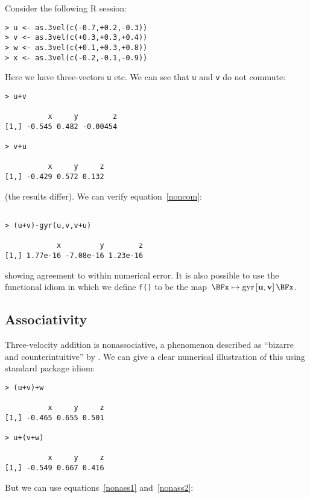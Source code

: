 \documentclass[ijoc,nonblindrev]{informs3} %
\begin{document}
Consider the following R session:

\begin{verbatim}
> u <- as.3vel(c(-0.7,+0.2,-0.3))
> v <- as.3vel(c(+0.3,+0.3,+0.4))
> w <- as.3vel(c(+0.1,+0.3,+0.8))
> x <- as.3vel(c(-0.2,-0.1,-0.9))

\end{verbatim}

Here we have three-vectors {\tt u} etc.  We can see that {\tt u} and
{\tt v} do not commute:

\begin{verbatim}
> u+v

          x     y        z
[1,] -0.545 0.482 -0.00454

> v+u

          x     y     z
[1,] -0.429 0.572 0.132

\end{verbatim}

(the results differ).  We can verify equation~\ref{noncom}:

\begin{verbatim}

> (u+v)-gyr(u,v,v+u)

            x         y        z 
[1,] 1.77e-16 -7.08e-16 1.23e-16

\end{verbatim}

showing agreement to within numerical error.  It is also possible to
use the functional idiom in which we define {\tt f()} to be the
map~$\BFx\mapsto\gyr{u}{v}\BFx$.

\subsection{Associativity}

Three-velocity addition is nonassociative, a phenomenon described as
``bizarre and counterintuitive'' by \cite{ungar1997}.  We can give a
clear numerical illustration of this using standard package idiom:

\begin{verbatim}
> (u+v)+w

          x     y     z
[1,] -0.465 0.655 0.501

> u+(v+w)

          x     y     z 
[1,] -0.549 0.667 0.416

\end{verbatim}

But we can use equations~\ref{nonass1} and~\ref{nonass2}:
\end{document}

